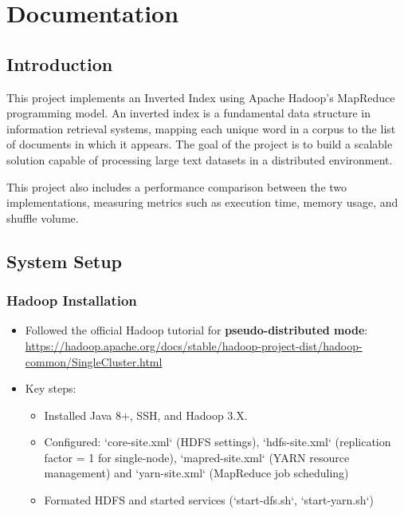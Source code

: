 

\chapter{Documentation}\label{ch:documentation}


\section{Introduction}\label{sec:introduction}

This project implements an Inverted Index using Apache Hadoop's MapReduce programming model.
An inverted index is a fundamental data structure in information retrieval systems, mapping each unique word in a corpus to the list of documents in which it appears.
The goal of the project is to build a scalable solution capable of processing large text datasets in a distributed environment.

This project also includes a performance comparison between the two implementations,
measuring metrics such as execution time, memory usage, and shuffle volume.


\section{System Setup}\label{sec:system-setup}

\subsection{Hadoop Installation}\label{subsec:hadoop-installation}

\begin{itemize}
    \item Followed the official Hadoop tutorial for \textbf{pseudo-distributed mode}: \url{https://hadoop.apache.org/docs/stable/hadoop-project-dist/hadoop-common/SingleCluster.html}
    \item Key steps:
            \begin{itemize}
                \item Installed Java 8+, SSH, and Hadoop 3.X\@.
                \item Configured: `core-site.xml` (HDFS settings),
                    `hdfs-site.xml` (replication factor = 1 for single-node),
                    `mapred-site.xml` (YARN resource management)
                    and `yarn-site.xml` (MapReduce job scheduling)
                \item Formated HDFS and started services (`start-dfs.sh`, `start-yarn.sh`)
            \end{itemize}
\end{itemize}

